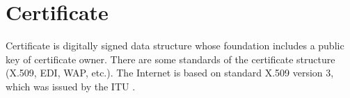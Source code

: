 \documentclass[
  digital, %
  notable,   %
  lof,     %
  lot,     %
]{fithesis3}
\begin{document}

\section{Certificate}
Certificate is digitally signed data structure whose foundation includes a public key of
certificate owner. There are some standards of the certificate structure (X.509, EDI, WAP, 
etc.). The Internet is based on standard X.509 version 3, which was issued by the ITU \cite{dostalek2016velky}. %
\end{document}
